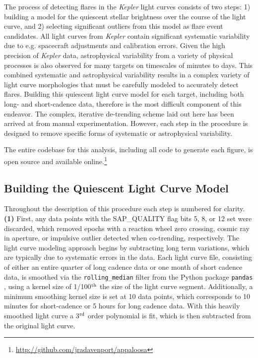\documentclass[twocolumn]{aastex6}
\newcommand{\Kepler}{\textsl{Kepler}\xspace}
\begin{document}
The process of detecting flares in the \Kepler light curves consists of two steps: 1) building a model for the quiescent stellar brightness over the course of the light curve, and 2) selecting significant outliers from this model as flare event candidates. All light curves from \Kepler contain significant systematic variability due to e.g. spacecraft adjustments and calibration errors. Given the high precision of \Kepler data, astrophysical variability from a variety of physical processes is also observed for many targets on timescales of minutes to days. This combined systematic and astrophysical variability results in a complex variety of light curve morphologies that must be carefully modeled to accurately detect flares. Building this quiescent light curve model for each target, including both long- and short-cadence data, therefore is the most difficult component of this endeavor. The complex, iterative de-trending scheme laid out here has been arrived at from manual experimentation. However, each step in the procedure is designed to remove specific forms of systematic or astrophysical variability.

The entire codebase for this analysis, including all code to generate each figure, is open source and available online.\footnote{\url{http://github.com/jradavenport/appaloosa}}




\subsection{Building the Quiescent Light Curve Model}
\label{sec:find1}
Throughout the description of this procedure each step is numbered for clarity.
{\bf (1)} First, any data points with the SAP\_QUALITY flag bits 5, 8, or 12 set were discarded, which removed epochs with a reaction wheel zero crossing, cosmic ray in aperture, or impulsive outlier detected when co-trending, respectively. The light curve modeling approach begins by subtracting long term variations, which are typically due to systematic errors in the data. Each light curve file, consisting of either an entire quarter of long cadence data or one month of short cadence data, is smoothed via the {\tt rolling\_median} filter from the Python package {\tt pandas} \citep{pandas}, using a kernel size of 1/100$^{\rm th}$ the size of the light curve segment. Additionally, a minimum smoothing kernel size is set at 10 data points, which corresponds to 10 minutes for short-cadence or 5 hours for long cadence data. With this heavily smoothed light curve a 3$^{\rm rd}$ order polynomial is fit, which is then subtracted from the original light curve.
\end{document}
